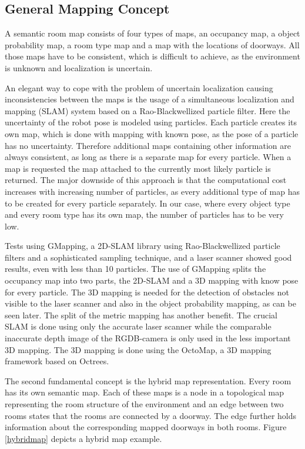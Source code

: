\subsection{General Mapping Concept} \label{ssec:num2}

A semantic room map consists of four types of maps, an occupancy map, a object probability map, a room type map and a map with the locations of doorways. All those maps have to be consistent, which is difficult to achieve, as the environment is unknown and localization is uncertain. 

An elegant way to cope with the problem of uncertain localization causing inconsistencies between the maps is the usage of a simultaneous localization and mapping (SLAM) system based on a Rao-Blackwellized particle filter. Here the uncertainty of the robot pose is modeled using particles. Each particle creates its own map, which is done with mapping with known pose, as the pose of a particle has no uncertainty. Therefore additional maps containing other information are always consistent, as long as there is a separate map for every particle. When a map is requested the map attached to the currently most likely particle is returned. The major downside of this approach is that the computational cost increases with increasing number of particles, as every additional type of map has to be created for every particle separately. In our case, where every object type and every room type has its own map, the number of particles has to be very low.

Tests using GMapping, a 2D-SLAM library using Rao-Blackwellized particle filters and a sophisticated sampling technique, and a laser scanner showed good results, even with less than 10 particles. The use of GMapping splits the occupancy map into two parts, the 2D-SLAM and a 3D mapping with know pose for every particle. The 3D mapping is needed for the detection of obstacles not visible to the laser scanner and also in the object probability mapping, as can be seen later. The split of the metric mapping has another benefit. The crucial SLAM is done using only the accurate laser scanner while the comparable inaccurate depth image of the RGDB-camera is only used in the less important 3D mapping. The 3D mapping is done using the OctoMap, a 3D mapping framework based on Octrees.

The second fundamental concept is the hybrid map representation. Every room has its own semantic map. Each of these maps is a node in a topological map representing the room structure of the environment and an edge between two rooms states that the rooms are connected by a doorway. The edge further holds information about the corresponding mapped doorways in both rooms. Figure \ref{hybridmap} depicts a hybrid map example.

